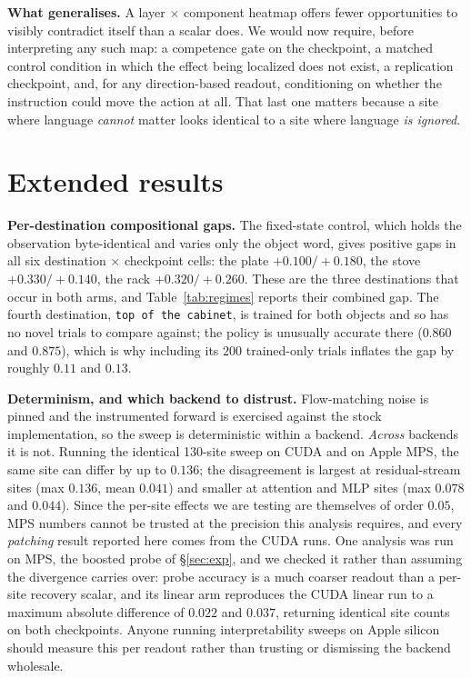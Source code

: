 \documentclass{article}
\begin{document}
\textbf{What generalises.} A layer $\times$ component heatmap offers fewer opportunities to
visibly contradict itself than a scalar does. We would now require, before interpreting any such
map: a competence gate on the checkpoint, a matched control condition in which the effect being
localized does not exist, a replication checkpoint, and, for any direction-based
readout, conditioning on whether the instruction could move the action at all. That last one
matters because a site where language \emph{cannot} matter looks identical to a site where
language \emph{is ignored}.

\section{Extended results}
\label{sec:extended}

\textbf{Per-destination compositional gaps.} The fixed-state control, which holds the
observation byte-identical and varies only the object word, gives positive gaps in all six
destination $\times$ checkpoint cells: the plate $+0.100 / +0.180$, the stove $+0.330 / +0.140$,
the rack $+0.320 / +0.260$. These are the three destinations that occur in both arms, and
Table~\ref{tab:regimes} reports their combined gap. The fourth destination,
\texttt{top of the cabinet}, is trained for both objects and so has no novel trials to compare
against; the policy is unusually accurate there ($0.860$ and $0.875$), which is why including
its $200$ trained-only trials inflates the gap by roughly $0.11$ and $0.13$.

\textbf{Determinism, and which backend to distrust.} Flow-matching noise is pinned and the
instrumented forward is exercised against the stock implementation, so the sweep is
deterministic within a backend. \emph{Across} backends it is not. Running the identical
130-site sweep on CUDA and on Apple MPS, the same site can differ by up to $0.136$; the
disagreement is largest at residual-stream sites (max $0.136$, mean $0.041$) and smaller at
attention and MLP sites (max $0.078$ and $0.044$). Since the per-site effects we are testing
are themselves of order $0.05$, MPS numbers cannot be trusted at the precision this analysis
requires, and every \emph{patching} result reported here comes from the CUDA runs. One analysis
was run on MPS, the boosted probe of \S\ref{sec:exp}, and we checked it rather than assuming the
divergence carries over: probe accuracy is a much coarser readout than a per-site recovery
scalar, and its linear arm reproduces the CUDA linear run to a maximum absolute difference of
$0.022$ and $0.037$, returning identical site counts on both checkpoints. Anyone running
interpretability sweeps on Apple silicon should measure this per readout rather than trusting or
dismissing the backend wholesale.
\end{document}

